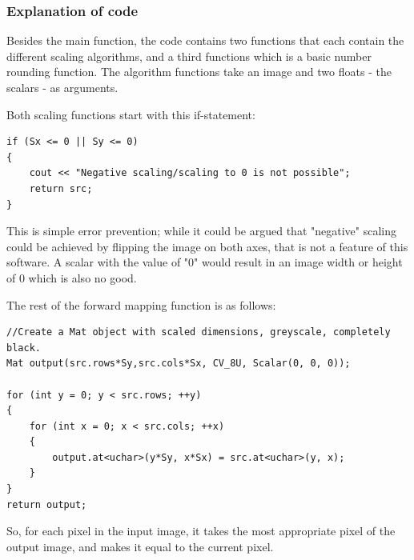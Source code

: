\documentclass[11pt,oneside,a4paper,openright]{report}
\begin{document}
\subsubsection{Explanation of code}
Besides the main function, the code contains two functions that each contain the different scaling algorithms, and a third functions which is a basic number rounding function. The algorithm functions take an image and two floats - the scalars - as arguments.

Both scaling functions start with this if-statement:
\begin{lstlisting}
if (Sx <= 0 || Sy <= 0)
{
	cout << "Negative scaling/scaling to 0 is not possible";
	return src;
}
\end{lstlisting}
This is simple error prevention; while it could be argued that "negative" scaling could be achieved by flipping the image on both axes, that is not a feature of this software. A scalar with the value of "0" would result in an image width or height of 0 which is also no good.

The rest of the forward mapping function is as follows:
\begin{lstlisting}
//Create a Mat object with scaled dimensions, greyscale, completely black.
Mat output(src.rows*Sy,src.cols*Sx, CV_8U, Scalar(0, 0, 0));

for (int y = 0; y < src.rows; ++y)
{
	for (int x = 0; x < src.cols; ++x)
	{
		output.at<uchar>(y*Sy, x*Sx) = src.at<uchar>(y, x);
	}
}
return output;
\end{lstlisting}
So, for each pixel in the input image, it takes the most appropriate pixel of the output image, and makes it equal to the current pixel.
\end{document}
